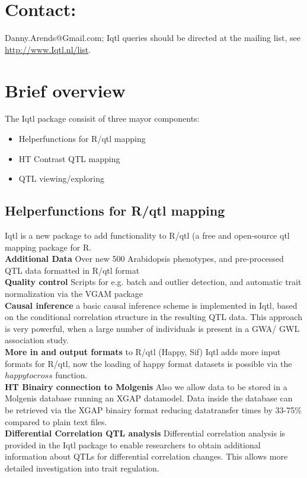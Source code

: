 \documentclass{bioinfo}
\begin{document}
\section{Contact:} 
Danny.Arends@Gmail.com; Iqtl queries should be
directed at the mailing list, see \href{http://www.Iqtl.nl/list}
{http://www.Iqtl.nl/list}.

\section*{Brief overview}
The Iqtl package consisit of three mayor components:
\begin{itemize}
\item Helperfunctions for R/qtl mapping
\item HT Contrast QTL mapping
\item QTL viewing/exploring
\end{itemize}

\subsection*{Helperfunctions for R/qtl mapping}
  Iqtl is a new package to add functionality to R/qtl \citep{Broman:2003} 
  (a free and open-source qtl mapping package for R\citep{RLang:2010}.\\
  {\bf Additional Data} 
  Over new 500 Arabidopsis phenotypes, and pre-processed 
  QTL data formatted in R/qtl format\\
  {\bf Quality control} 
  Scripts for e.g. batch and outlier detection, and automatic 
  trait normalization via the VGAM package\\
  {\bf Causal inference}
  a basic causal inference scheme is implemented in Iqtl, 
  based on the conditional correlation structure in the 
  resulting QTL data. This approach is very powerful, 
  when a large number of individuals is present in a GWA/
  GWL association study.\\
  {\bf More in and output formats} to R/qtl (Happy, Sif)
  Iqtl adds more input formats for R/qtl, now the loading of 
  happy format datasets is possible via the $happytocross$ function.\\
  {\bf HT Binairy connection to Molgenis}
  Also we allow data to be stored in a Molgenis database running 
  an XGAP datamodel. Data inside the database can be retrieved 
  via the XGAP binairy format reducing datatransfer times by 33-75\% 
  compared to plain text files.\\
  {\bf Differential Correlation QTL analysis}
  Differential correlation analysis is provided in the Iqtl 
  package to enable researchers to obtain additional information 
  about QTLs for differential correlation changes. This allows 
  more detailed investigation into trait regulation.
\end{document}
